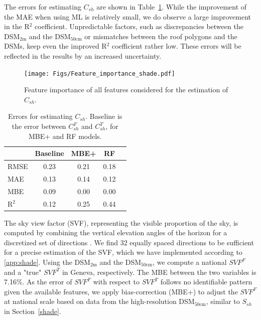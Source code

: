 The errors for estimating $C_{sh}$ are shown in Table~\ref{tab:errors_Csh}. While the improvement of the MAE when using ML is relatively small, we do observe a large improvement in the R$^2$ coefficient.
Unpredictable factors, such as discrepancies between the DSM$_{2\text{m}}$ and the DSM$_{50\text{cm}}$ or mismatches between the roof polygons and the DSMs, keep even the improved R$^2$ coefficient rather low. 
These errors will be reflected in the results by an increased uncertainty.

\begin{figure}[tb]
\centering
\texttt{[image: Figs/Feature\_importance\_shade.pdf]}  
\caption{Feature importance of all features considered for the estimation of $C_{sh}$.}
\label{fig:RF_Csh}
\end{figure}

\begin{table}[tb]
\centering
\footnotesize
\caption{Errors for estimating $C_{sh}$. Baseline is the error between $C_{sh}^F$ and $C_{sh}^T$, for MBE+ and RF models.}
\label{tab:errors_Csh}
\begin{tabular}{lcccc}
\hline
      & \textbf{Baseline} & \textbf{MBE+} & \textbf{RF}   \\ \hline
RMSE  & 0.23     & 0.21  & 0.18 \\
MAE   & 0.13     & 0.14  & 0.12 \\
MBE   & 0.09     & 0.00  & 0.00 \\
R$^2$ & 0.12     & 0.25  & 0.44 \\ \hline
\end{tabular}
\end{table}

The sky view factor (SVF), representing the visible proportion of the sky, is computed by combining the vertical elevation angles of the horizon for a discretized set of directions \cite{zaksek_sky-view_2011}. We find 32 equally spaced directions to be sufficient for a precise estimation of the SVF, which we have implemented according to \ref{app:shade}.
Using the DSM$_{2\text{m}}$ and the DSM$_{50\text{cm}}$, we compute a national $\mathit{SVF}^F$ and a "true" $\mathit{SVF}^T$ in Geneva, respectively. The MBE between the two variables is 7.16\%.  
As the error of $\mathit{SVF}^F$ with respect to $\mathit{SVF}^T$ follows no identifiable pattern given the available features, we apply bias-correction (MBE+) to adjust the $\mathit{SVF}^F$ at national scale based on data from the high-resolution DSM$_{50\text{cm}}$, similar to $S_{sh}$ in Section~\ref{shade}.

